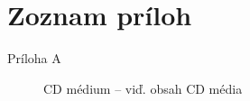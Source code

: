 
\chapter*{Zoznam príloh}

\begin{description}
    \item[Príloha A] CD médium -- viď. obsah CD média
\end{description}

